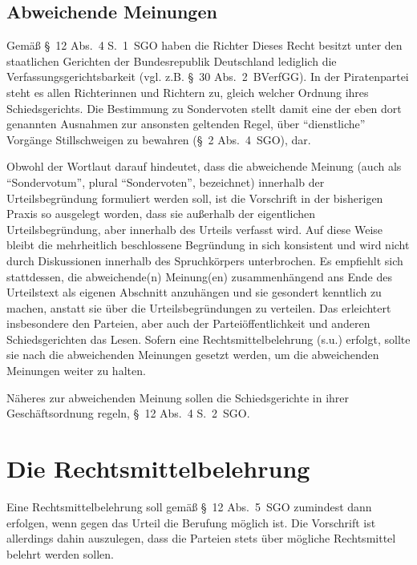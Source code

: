 \subsection{Abweichende Meinungen}
Gemäß \S~12 Abs.~4 S.~1~SGO haben die Richter  Dieses Recht besitzt unter den staatlichen Gerichten der Bundesrepublik Deutschland lediglich die Verfassungsgerichtsbarkeit (vgl. z.B. \S~30 Abs.~2~BVerfGG).
In der Piratenpartei steht es allen Richterinnen und Richtern zu, gleich welcher Ordnung ihres Schiedsgerichts. Die Bestimmung zu Sondervoten stellt damit eine der eben dort genannten Ausnahmen zur ansonsten geltenden Regel, über \enquote{dienstliche} Vorgänge Stillschweigen zu bewahren (\S~2 Abs.~4~SGO), dar.

Obwohl der Wortlaut darauf hindeutet, dass die abweichende Meinung (auch als \enquote{Sondervotum}, plural \enquote{Sondervoten}, bezeichnet) innerhalb der Urteilsbegründung formuliert werden soll, ist die Vorschrift in der bisherigen Praxis so ausgelegt worden, dass sie außerhalb der eigentlichen Urteilsbegründung, aber innerhalb des Urteils verfasst wird. Auf diese Weise bleibt die mehrheitlich beschlossene Begründung in sich konsistent und wird nicht durch Diskussionen innerhalb des Spruchkörpers unterbrochen. Es empfiehlt sich stattdessen, die abweichende(n) Meinung(en) zusammenhängend ans Ende des Urteilstext als eigenen Abschnitt anzuhängen und sie gesondert kenntlich zu machen, anstatt sie über die Urteilsbegründungen zu verteilen. Das erleichtert insbesondere den Parteien, aber auch der Parteiöffentlichkeit und anderen Schiedsgerichten das Lesen. Sofern eine Rechtsmittelbelehrung (s.u.) erfolgt, sollte sie nach die abweichenden Meinungen gesetzt werden, um die abweichenden Meinungen weiter  zu halten.

Näheres zur abweichenden Meinung sollen die Schiedsgerichte in ihrer Geschäftsordnung regeln, \S~12 Abs.~4 S.~2~SGO.

\section{Die Rechtsmittelbelehrung}
Eine Rechtsmittelbelehrung soll gemäß \S~12 Abs.~5~SGO zumindest dann erfolgen, wenn gegen das Urteil die Berufung möglich ist. Die Vorschrift ist allerdings dahin auszulegen, dass die Parteien stets über mögliche Rechtsmittel belehrt werden sollen.

